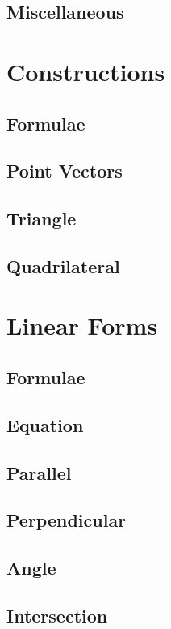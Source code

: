 \documentclass[journal]{IEEEtran}
\begin{document}
\subsection{Miscellaneous}

\newpage
\section{Constructions}
\subsection{Formulae}

\subsection{Point Vectors}

\subsection{Triangle}

\subsection{Quadrilateral}

\newpage
\section{Linear Forms}
\subsection{Formulae}

\subsection{Equation }

\subsection{Parallel}

\subsection{Perpendicular}

\subsection{Angle}

\subsection{Intersection}

\end{document}

